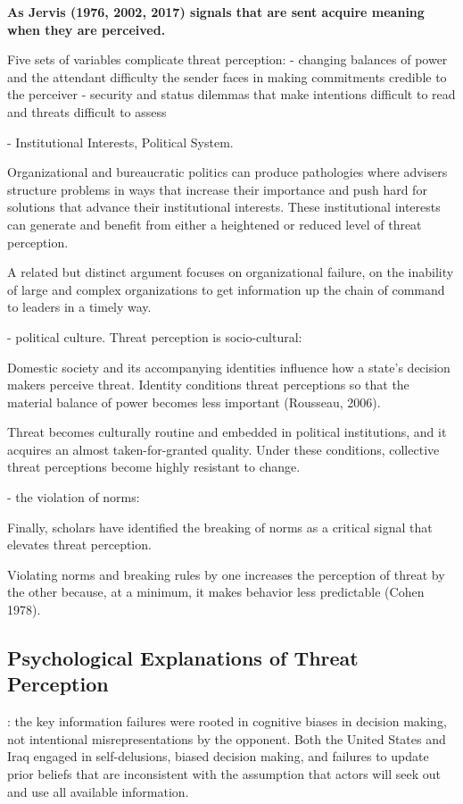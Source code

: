 \textbf{As Jervis (1976, 2002, 2017) signals that are sent acquire meaning when they are perceived.}

Five sets of variables complicate threat perception:
- changing balances of power and the attendant difficulty the sender faces in making commitments credible to the perceiver
- security and status dilemmas that make intentions difficult to read and threats difficult to assess

- Institutional Interests, Political System.

Organizational and bureaucratic politics can produce pathologies where advisers structure problems in ways that increase their importance and push hard for solutions that advance their institutional interests. These institutional interests can generate and benefit from either a heightened or reduced level of threat perception.

A related but distinct argument
focuses on organizational failure, on the inability of large and complex organizations to get information up the
chain of command to leaders in a timely way.

- political culture. Threat perception is socio-cultural:

Domestic society and its accompanying identities influence how a state’s decision makers perceive threat. Identity conditions threat perceptions so that the material balance of power becomes less important (Rousseau, 2006).

Threat becomes culturally routine and embedded in political institutions, and it
acquires an almost taken-for-granted quality. Under these conditions, collective threat perceptions become
highly resistant to change.

- the violation of norms:

Finally, scholars have identified the breaking of norms as a critical signal that elevates threat perception.

Violating norms and breaking rules by one increases the perception of threat by the other because, at a minimum, it makes behavior less predictable (Cohen 1978).

\subsection{Psychological Explanations of Threat Perception}

\textcite{lakeTwoCheersBargaining2010}: the key information failures were rooted in cognitive biases in decision making, not intentional misrepresentations by the opponent. Both the United States and Iraq engaged in self-delusions, biased decision making, and failures to update prior beliefs that are inconsistent with the assumption that actors will seek out and use all available information.

